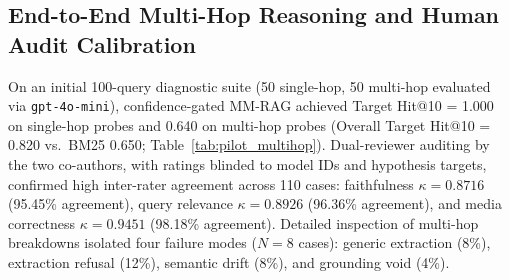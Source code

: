 \documentclass[conference]{IEEEtran}
\begin{document}
\subsection{End-to-End Multi-Hop Reasoning and Human Audit Calibration}
On an initial 100-query diagnostic suite (50 single-hop, 50 multi-hop evaluated via \texttt{gpt-4o-mini}), confidence-gated MM-RAG achieved Target Hit@10 = 1.000 on single-hop probes and 0.640 on multi-hop probes (Overall Target Hit@10 = 0.820 vs.\ BM25 0.650; Table~\ref{tab:pilot_multihop}). Dual-reviewer auditing by the two co-authors, with ratings blinded to model IDs and hypothesis targets, confirmed high inter-rater agreement across 110 cases: faithfulness $\kappa = 0.8716$ (95.45\% agreement), query relevance $\kappa = 0.8926$ (96.36\% agreement), and media correctness $\kappa = 0.9451$ (98.18\% agreement). Detailed inspection of multi-hop breakdowns isolated four failure modes ($N=8$ cases): generic extraction (8\%), extraction refusal (12\%), semantic drift (8\%), and grounding void (4\%).

\begin{table}[h]
\centering
\small
\caption{Preliminary End-to-End Diagnostic Suite ($N=100$: 50 single-hop, 50 multi-hop queries evaluated via GPT-4o-mini).}
\label{tab:pilot_multihop}
\end{table}
\end{document}
